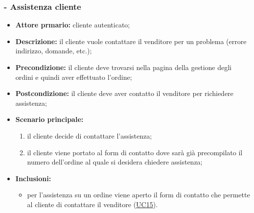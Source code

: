 \subsubsection{ - Assistenza cliente}
\begin{itemize}
    \item \textbf{Attore prmario:} cliente autenticato;
    \item \textbf{Descrizione:} il cliente vuole contattare il venditore per un problema (errore indirizzo, domande, etc.);
    \item \textbf{Precondizione:} il cliente deve trovarsi nella pagina della gestione degli ordini e quindi aver effettuato l'ordine;
    \item \textbf{Postcondizione:} il cliente deve aver contatto il venditore per richiedere assistenza;
    \item \textbf{Scenario principale:}
          \begin{enumerate}
              \item il cliente decide di contattare l'assistenza;
              \item il cliente viene portato al form di contatto dove sarà già precompilato il numero dell'ordine al quale si desidera chiedere assistenza;
          \end{enumerate}
    \item \textbf{Inclusioni:}
          \begin{itemize}
              \item per l'assistenza su un ordine viene aperto il form di contatto che permette al cliente di contattare il venditore (\hyperref[UC15]{UC15}).
          \end{itemize}
\end{itemize}

\stepsubUserCase
